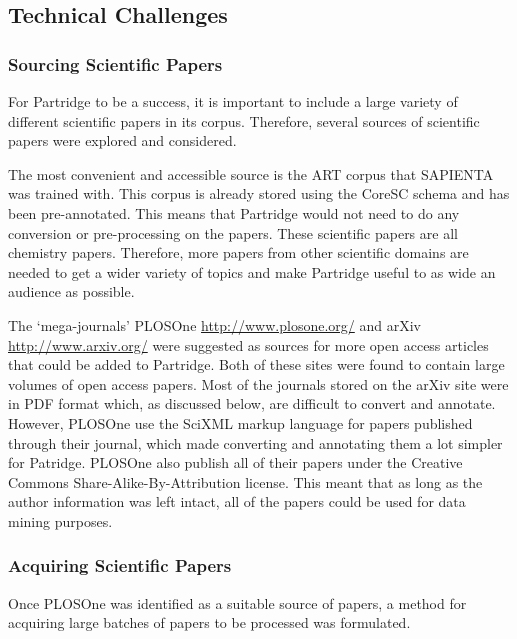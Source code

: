 %  
%


\subsection{Technical Challenges}

\subsubsection{ Sourcing Scientific Papers}
For Partridge to be a success, it is important to include a large variety of
different scientific papers in its corpus. Therefore, several sources of
scientific papers were explored and considered.

The most convenient and accessible source is the ART corpus that SAPIENTA was
trained with\cite{citeulike:11077287}. This corpus is already stored using the
CoreSC schema and has been pre-annotated. This means that Partridge would not
need to do any conversion or pre-processing on the papers. These scientific
papers are all chemistry papers. Therefore, more papers from other scientific
domains are needed to get a wider variety of topics and make Partridge useful
to as wide an audience as possible. 

The `mega-journals' PLOSOne \url{http://www.plosone.org/} and arXiv
\url{http://www.arxiv.org/} were suggested as sources for more open access
articles that could be added to Partridge. Both of these sites were found to
contain large volumes of open access papers. Most of the journals stored on the
arXiv site were in PDF format which, as discussed below, are difficult to
convert and annotate. However, PLOSOne use the SciXML markup language for
papers published through their journal, which made converting and annotating
them a lot simpler for Patridge. PLOSOne also publish all of their papers under
the Creative Commons Share-Alike-By-Attribution license\cite{ccbyattr}. This
meant that as long as the author information was left intact, all of the papers
could be used for data mining purposes.

\subsubsection{Acquiring Scientific Papers}
Once PLOSOne was identified as a suitable source of papers, a method for
acquiring large batches of papers to be processed was formulated.

